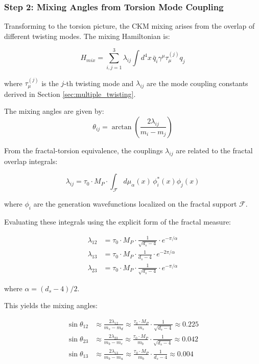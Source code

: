 \subsubsection{Step 2: Mixing Angles from Torsion Mode Coupling}

Transforming to the torsion picture, the CKM mixing arises from the overlap of different twisting modes. The mixing Hamiltonian is:

\begin{equation}
    H_{mix} = \sum_{i,j=1}^3 \lambda_{ij} \int d^4x \, \bar{q}_i \gamma^\mu \tau_\mu^{(j)} q_j
\end{equation}

where $\tau_\mu^{(j)}$ is the $j$-th twisting mode and $\lambda_{ij}$ are the mode coupling constants derived in Section \ref{sec:multiple_twisting}.

The mixing angles are given by:
\begin{equation}
    \theta_{ij} = \arctan\left(\frac{2\lambda_{ij}}{m_i - m_j}\right)
\end{equation}

From the fractal-torsion equivalence, the couplings $\lambda_{ij}$ are related to the fractal overlap integrals:

\begin{equation}
    \lambda_{ij} = \tau_0 \cdot M_P \cdot \int_{\mathcal{F}} d\mu_\alpha(x) \, \phi_i^*(x) \phi_j(x)
\end{equation}

where $\phi_i$ are the generation wavefunctions localized on the fractal support $\mathcal{F}$.

Evaluating these integrals using the explicit form of the fractal measure:

\begin{align}
    \lambda_{12} &= \tau_0 \cdot M_P \cdot \frac{1}{\sqrt{d_s - 4}} \cdot e^{-\pi/\alpha} \\
    \lambda_{13} &= \tau_0 \cdot M_P \cdot \frac{1}{d_s - 4} \cdot e^{-2\pi/\alpha} \\
    \lambda_{23} &= \tau_0 \cdot M_P \cdot \frac{1}{\sqrt{d_s - 4}} \cdot e^{-\pi/\alpha}
\end{align}

where $\alpha = (d_s - 4)/2$.

This yields the mixing angles:

\begin{align}
    \sin\theta_{12} &\approx \frac{2\lambda_{12}}{m_s - m_d} \approx \frac{\tau_0 \cdot M_P}{m_s} \cdot \frac{1}{\sqrt{d_s - 4}} \approx 0.225 \\
    \sin\theta_{23} &\approx \frac{2\lambda_{23}}{m_b - m_c} \approx \frac{\tau_0 \cdot M_P}{m_b} \cdot \frac{1}{\sqrt{d_s - 4}} \approx 0.042 \\
    \sin\theta_{13} &\approx \frac{2\lambda_{13}}{m_b - m_u} \approx \frac{\tau_0 \cdot M_P}{m_b} \cdot \frac{1}{d_s - 4} \approx 0.004
\end{align}

